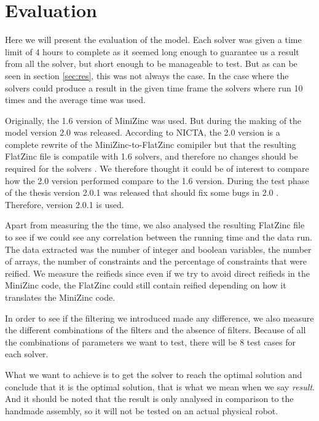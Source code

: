 \chapter{Evaluation}\label{cha:eval}
Here we will present the evaluation of the model. Each solver was given a time limit of 4 hours to complete as it seemed long enough to guarantee us a result from all the solver, but short enough to be manageable to test. But as can be seen in section \ref{sec:res}, this was not always the case. In the case where the solvers could produce a result in the given time frame the solvers where run 10 times and the average time was used.

Originally, the 1.6 version of MiniZinc was used. But during the making of the model version 2.0 was released. According to NICTA, the 2.0 version is a complete rewrite of the MiniZinc-to-FlatZinc comipiler but that the resulting FlatZinc file is compatile with 1.6 solvers, and therefore no changes should be required for the solvers \cite{mz2}. We therefore thought it could be of interest to compare how the 2.0 version performed compare to the 1.6 version. During the test phase of the thesis version 2.0.1 was released that should fix some bugs in 2.0 \cite{mz2_changelog}. Therefore, version 2.0.1 is used.

Apart from measuring the the time, we also analysed the resulting FlatZinc file to see if we could see any correlation between the running time and the data run. The data extracted was the number of integer and boolean variables, the number of arrays, the number of constraints and the percentage of constraints that were reified. We measure the reifieds since even if we try to avoid direct reifieds in the MiniZinc code, the FlatZinc could still contain reified depending on how it translates the MiniZinc code.

In order to see if the filtering we introduced made any difference, we also measure the different combinations of the filters and the absence of filters. Because of all the combinations of parameters we want to test, there will be 8 test cases for each solver.

What we want to achieve is to get the solver to reach the optimal solution and conclude that it is the optimal solution, that is what we mean when we say \emph{result}. And it should be noted that the result is only analysed in comparison to the handmade assembly, so it will not be tested on an actual physical robot.

